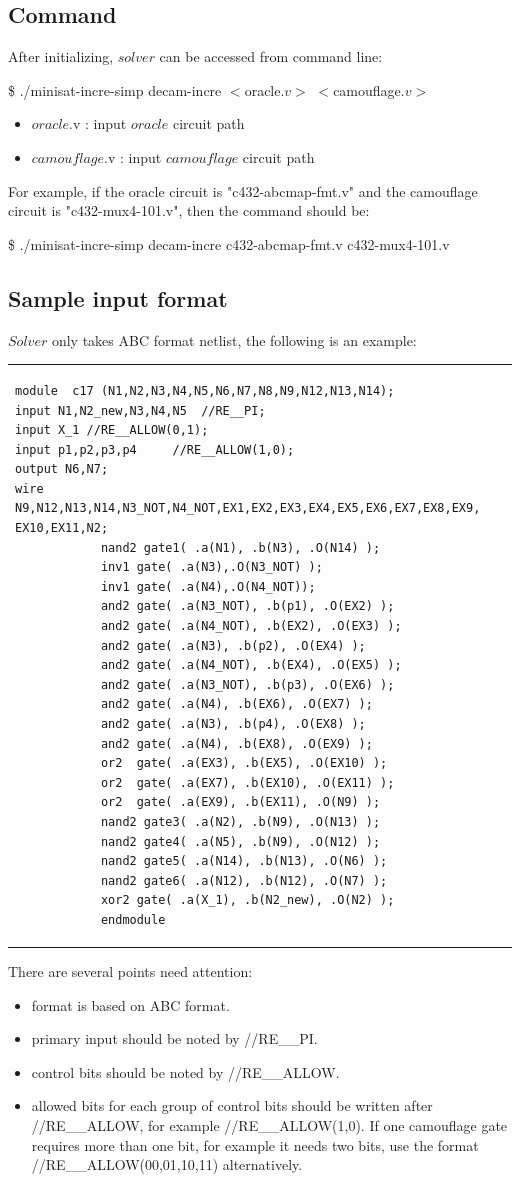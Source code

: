 \documentclass{article}
\begin{document}
	\subsection{Command}
		After initializing, $solver$ can be accessed from command line:
		\newline
		\centerline{ \$ ./minisat-incre-simp decam-incre $<$oracle$.v>$ $<$camouflage$.v>$}
			\begin{itemize}
				\item $oracle$.v : input $oracle$ circuit path 
				\item $camouflage$.v : input $camouflage$ circuit path
			\end{itemize}
		For example, if the oracle circuit is "c432-abcmap-fmt.v" and the camouflage circuit is "c432-mux4-101.v", then the command should be:
		\newline
		\centerline{\$ ./minisat-incre-simp decam-incre c432-abcmap-fmt.v c432-mux4-101.v}
	\subsection{Sample input format}
	$Solver$ only takes ABC format netlist, the following is an example: 
	\newline
	\begin{tabular}{|p{13cm}|}
 		 \begin{verbatim}
module	c17 (N1,N2,N3,N4,N5,N6,N7,N8,N9,N12,N13,N14);
input N1,N2_new,N3,N4,N5  //RE__PI;
input X_1 //RE__ALLOW(0,1);
input p1,p2,p3,p4     //RE__ALLOW(1,0);
output N6,N7;
wire N9,N12,N13,N14,N3_NOT,N4_NOT,EX1,EX2,EX3,EX4,EX5,EX6,EX7,EX8,EX9,
EX10,EX11,N2;
			nand2 gate1( .a(N1), .b(N3), .O(N14) );
			inv1 gate( .a(N3),.O(N3_NOT) );
			inv1 gate( .a(N4),.O(N4_NOT));
			and2 gate( .a(N3_NOT), .b(p1), .O(EX2) );
			and2 gate( .a(N4_NOT), .b(EX2), .O(EX3) );
			and2 gate( .a(N3), .b(p2), .O(EX4) );
			and2 gate( .a(N4_NOT), .b(EX4), .O(EX5) );
			and2 gate( .a(N3_NOT), .b(p3), .O(EX6) );
			and2 gate( .a(N4), .b(EX6), .O(EX7) );
			and2 gate( .a(N3), .b(p4), .O(EX8) );
			and2 gate( .a(N4), .b(EX8), .O(EX9) );
			or2  gate( .a(EX3), .b(EX5), .O(EX10) );
			or2  gate( .a(EX7), .b(EX10), .O(EX11) );
			or2  gate( .a(EX9), .b(EX11), .O(N9) );
			nand2 gate3( .a(N2), .b(N9), .O(N13) );
			nand2 gate4( .a(N5), .b(N9), .O(N12) );
			nand2 gate5( .a(N14), .b(N13), .O(N6) );
			nand2 gate6( .a(N12), .b(N12), .O(N7) );
			xor2 gate( .a(X_1), .b(N2_new), .O(N2) );
			endmodule
  		\end{verbatim}
	\end{tabular}
	\newline
	There are several points need attention:
	\begin{itemize}
		\item format is based on ABC format.
		\item primary input should be noted by \///RE\_\_PI.
		\item control bits should be noted by  \///RE\_\_ALLOW.
		\item allowed bits for each group of control bits should be written after  \///RE\_\_ALLOW, for example  \///RE\_\_ALLOW(1,0). If one camouflage gate requires more than one bit, for example it needs two bits, use the format  \///RE\_\_ALLOW(00,01,10,11) alternatively. 
	\end{itemize}
\end{document}
